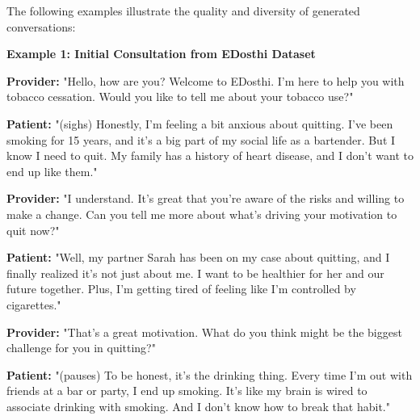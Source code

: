 The following examples illustrate the quality and diversity of generated conversations:

\begin{mdframed}[linecolor=black, linewidth=1pt, backgroundcolor=gray!5, roundcorner=10pt, innerleftmargin=10pt, innerrightmargin=10pt]
\textbf{Example 1: Initial Consultation from EDosthi Dataset}

{\footnotesize
\textbf{Provider:} "Hello, how are you? Welcome to EDosthi. I'm here to help you with tobacco cessation. Would you like to tell me about your tobacco use?"

\textbf{Patient:} "(sighs) Honestly, I'm feeling a bit anxious about quitting. I've been smoking for 15 years, and it's a big part of my social life as a bartender. But I know I need to quit. My family has a history of heart disease, and I don't want to end up like them."

\textbf{Provider:} "I understand. It's great that you're aware of the risks and willing to make a change. Can you tell me more about what's driving your motivation to quit now?"

\textbf{Patient:} "Well, my partner Sarah has been on my case about quitting, and I finally realized it's not just about me. I want to be healthier for her and our future together. Plus, I'm getting tired of feeling like I'm controlled by cigarettes."

\textbf{Provider:} "That's a great motivation. What do you think might be the biggest challenge for you in quitting?"

\textbf{Patient:} "(pauses) To be honest, it's the drinking thing. Every time I'm out with friends at a bar or party, I end up smoking. It's like my brain is wired to associate drinking with smoking. And I don't know how to break that habit."
}
\end{mdframed}


